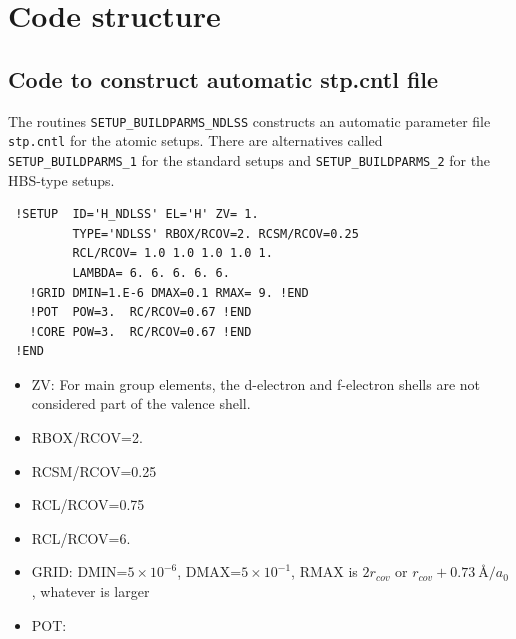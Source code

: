 \documentclass[11pt,a4paper]{report}
\begin{document}
\chapter{Code structure}
\section{Code to construct automatic stp.cntl file}
The routines \verb|SETUP_BUILDPARMS_NDLSS| constructs an automatic
parameter file \verb|stp.cntl| for the atomic setups. There are
alternatives called \verb|SETUP_BUILDPARMS_1| for the standard setups
and \verb|SETUP_BUILDPARMS_2| for the HBS-type setups.



\begin{verbatim}
 !SETUP  ID='H_NDLSS' EL='H' ZV= 1.
         TYPE='NDLSS' RBOX/RCOV=2. RCSM/RCOV=0.25
         RCL/RCOV= 1.0 1.0 1.0 1.0 1.
         LAMBDA= 6. 6. 6. 6. 6.
   !GRID DMIN=1.E-6 DMAX=0.1 RMAX= 9. !END
   !POT  POW=3.  RC/RCOV=0.67 !END
   !CORE POW=3.  RC/RCOV=0.67 !END
 !END
\end{verbatim}

\begin{itemize}
\item ZV: For main group elements, the d-electron and f-electron
  shells are not considered part of the valence shell.
\item RBOX/RCOV=2.
\item RCSM/RCOV=0.25
\item RCL/RCOV=0.75
\item RCL/RCOV=6.
\item GRID: DMIN=$5\times 10^{-6}$,
DMAX=$5\times 10^{-1}$,
RMAX is $2r_{cov}$ or $r_{cov}+0.73~$\AA$/a_0$, whatever is larger
\item POT:
\end{itemize}
\end{document}
